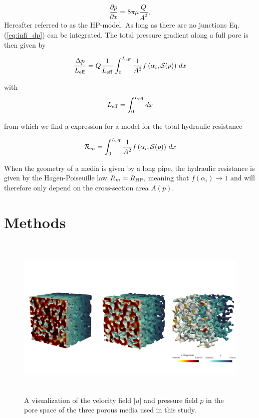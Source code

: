 \documentclass[draft]{agujournal2019}
\begin{document}
\begin{equation}
		\frac{\partial p}{\partial x} = 8 \pi \mu\frac{Q}{A^2}, \label{eq:HP}
\end{equation}
Hereafter referred to as the HP-model. As long as there are no junctions Eq.(\ref{eq:infi_dp}) can be integrated. The total pressure gradient along a full pore is then given by

\begin{equation}
	\frac{\Delta p}{L_{\rm{eff}}} =  Q \frac{1}{L_{\rm{eff}}}\int^{L_{\rm{eff}}}_{0}\frac{1}{A^2}f\left(\alpha_i,\mathcal{S}(p)\right)\,dx
\end{equation}

with 
\begin{equation}
	L_{\rm{eff}} = \int^{L_{\rm{eff}}}_{0} dx
\end{equation}

from which we find a expression for a model for the total hydraulic resistance 

\begin{equation}
	\mathcal{R}_m = \int^{L_{\rm{eff}}}_{0}\frac{1}{A^2}f\left(\alpha_i,\mathcal{S}(p)\right)\,dx\label{eq:R_model}
\end{equation}

When the geometry of a media is given by a long pipe, the hydraulic resistance is given by the Hagen-Poiseuille law $R_m = R_{\rm{HP}}$, meaning that $f(\alpha_i)\rightarrow 1$ and will therefore only depend on the cross-section area  $A(p)$.



\section{Methods}
\begin{figure}[t!]
\includegraphics[height=8cm]{figures/PM_combined_surfaces_DNS.png}
\caption{A visualization of the velocity field $|u|$ and pressure field $p$ in the pore space of the three porous media used in this study.}
\label{fig:DNS}
\end{figure}
\end{document}
